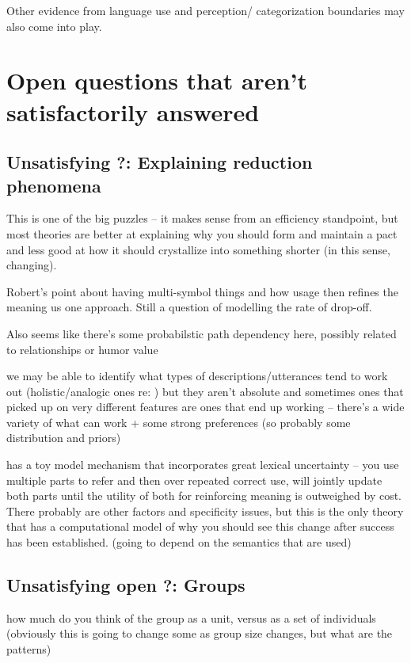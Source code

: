 \documentclass[]{article}
\begin{document}
Other evidence from language use and perception/ categorization boundaries may also come into play. 

\section{Open questions that aren't satisfactorily answered}
\subsection{Unsatisfying ?: Explaining reduction phenomena}
This is one of the big puzzles -- it makes sense from an efficiency standpoint, but most theories are better at explaining why you should form and maintain a pact and less good at how it should crystallize into something shorter (in this sense, changing). 

Robert's point about having multi-symbol things and how usage then refines the meaning us one approach. Still a question of modelling the rate of drop-off. 

Also seems like there's some probabilstic path dependency here, possibly related to relationships or humor value

we may be able to identify what types of descriptions/utterances tend to work out (holistic/analogic ones re: \cite{clark1986}) but they aren't absolute and sometimes ones that picked up on very different features are ones that end up working -- there's a wide variety of what can work + some strong preferences (so probably some distribution and priors) 

\cite{hawkins2021} has a toy model mechanism that incorporates great lexical uncertainty -- you use multiple parts to refer and then over repeated correct use, will jointly update both parts until the utility of both for reinforcing meaning is outweighed by cost. There probably are other factors and specificity issues, but this is the only theory that has a computational model of why you should see this change after success has been established. (going to depend on the semantics that are used) 

\subsection{Unsatisfying open ?: Groups}


\cite{yoon2019} how much do you think of the group as a unit, versus as a set of individuals (obviously this is going to change some as group size changes, but what are the patterns) 
\end{document}
